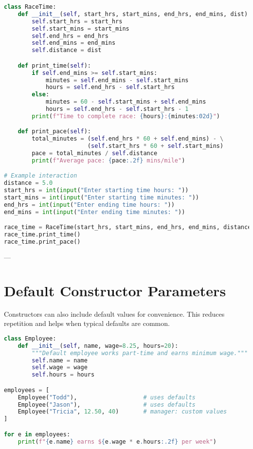 \begin{lstlisting}[language=Python, caption={RaceTime class with methods.}]
class RaceTime:
    def __init__(self, start_hrs, start_mins, end_hrs, end_mins, dist):
        self.start_hrs = start_hrs
        self.start_mins = start_mins
        self.end_hrs = end_hrs
        self.end_mins = end_mins
        self.distance = dist

    def print_time(self):
        if self.end_mins >= self.start_mins:
            minutes = self.end_mins - self.start_mins
            hours = self.end_hrs - self.start_hrs
        else:
            minutes = 60 - self.start_mins + self.end_mins
            hours = self.end_hrs - self.start_hrs - 1
        print(f"Time to complete race: {hours}:{minutes:02d}")

    def print_pace(self):
        total_minutes = (self.end_hrs * 60 + self.end_mins) - \
                        (self.start_hrs * 60 + self.start_mins)
        pace = total_minutes / self.distance
        print(f"Average pace: {pace:.2f} mins/mile")

# Example interaction
distance = 5.0
start_hrs = int(input("Enter starting time hours: "))
start_mins = int(input("Enter starting time minutes: "))
end_hrs = int(input("Enter ending time hours: "))
end_mins = int(input("Enter ending time minutes: "))

race_time = RaceTime(start_hrs, start_mins, end_hrs, end_mins, distance)
race_time.print_time()
race_time.print_pace()
\end{lstlisting}

---

\section{Default Constructor Parameters}

Constructors can also include default values for convenience.  
This reduces repetition and helps when typical defaults are common.

\begin{lstlisting}[language=Python, caption={Employee class with default parameters.}]
class Employee:
    def __init__(self, name, wage=8.25, hours=20):
        """Default employee works part-time and earns minimum wage."""
        self.name = name
        self.wage = wage
        self.hours = hours

employees = [
    Employee("Todd"),                   # uses defaults
    Employee("Jason"),                  # uses defaults
    Employee("Tricia", 12.50, 40)       # manager: custom values
]

for e in employees:
    print(f"{e.name} earns ${e.wage * e.hours:.2f} per week")
\end{lstlisting}

